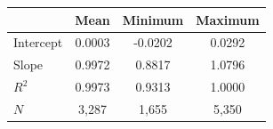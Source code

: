 \begin{tabular}{lccc}
\toprule
 & Mean & Minimum & Maximum \\
\midrule
Intercept & 0.0003 & -0.0202 & 0.0292 \\
Slope & 0.9972 & 0.8817 & 1.0796 \\
$R^2$ & 0.9973 & 0.9313 & 1.0000 \\
$N$ & 3,287 & 1,655 & 5,350 \\
\bottomrule
\end{tabular}
